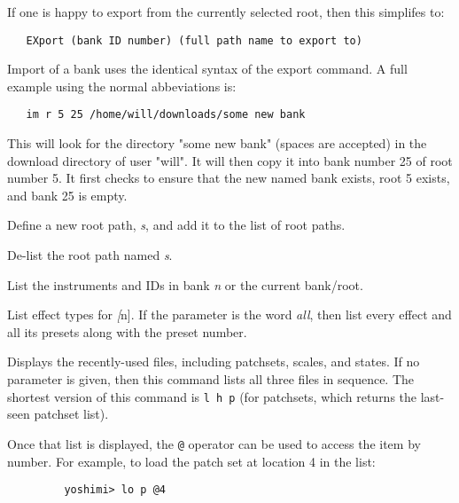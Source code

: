    If one is happy to export from the currently selected root, then this
   simplifes to:

\begin{verbatim}
   EXport (bank ID number) (full path name to export to)
\end{verbatim}

      Import of a bank uses the identical syntax of the export command.
      A full example using the normal abbeviations is:

\begin{verbatim}
   im r 5 25 /home/will/downloads/some new bank
\end{verbatim}

      This will look for the directory "some new bank" (spaces are accepted) in
      the download directory of user "will". It will then copy it into bank number
      25 of root number 5. It first checks to ensure that the new named bank
      exists, root 5 exists, and bank 25 is empty.

      Define a new root path, \textsl{s}, and add it to the list of root paths.

      De-list the root path named \textsl{s}.

      List the instruments and IDs in bank \textsl{n} or the
      current bank/root.

      List effect types for \textsl[n].
      If the parameter is the word \textsl{all},
      then list every effect and all its
      presets along with the preset number.

      Displays the recently-used files, including patchsets, scales, and
      states.  If no parameter is given, then this command lists all three
      files in sequence.  The shortest version of this command is
      \texttt{l h p} (for patchsets, which returns the last-seen patchset list).

      Once that list is displayed,
      the \texttt{@} operator can be used to access
      the item by number.  For example, to load the patch set at location 4 in
      the list:

      \begin{verbatim}
         yoshimi> lo p @4
      \end{verbatim}

